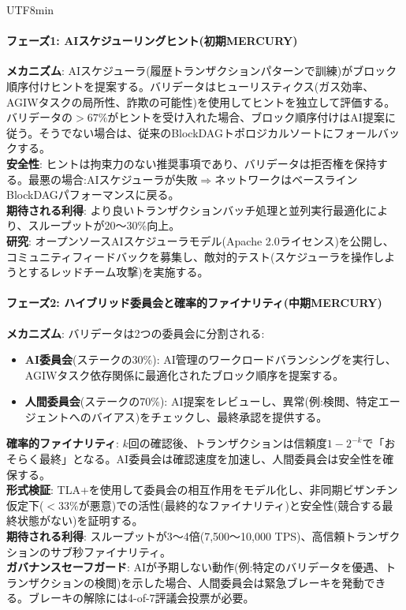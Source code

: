 \documentclass[11pt]{article}
\begin{document}
\begin{CJK}{UTF8}{min}
\paragraph{フェーズ1: AIスケジューリングヒント(初期MERCURY)}
\textbf{メカニズム}: AIスケジューラ(履歴トランザクションパターンで訓練)がブロック順序付けヒントを提案する。バリデータはヒューリスティクス(ガス効率、AGIWタスクの局所性、詐欺の可能性)を使用してヒントを独立して評価する。バリデータの$>67\%$がヒントを受け入れた場合、ブロック順序付けはAI提案に従う。そうでない場合は、従来のBlockDAGトポロジカルソートにフォールバックする。\\
\textbf{安全性}: ヒントは拘束力のない推奨事項であり、バリデータは拒否権を保持する。最悪の場合:AIスケジューラが失敗$\Rightarrow$ネットワークはベースラインBlockDAGパフォーマンスに戻る。\\
\textbf{期待される利得}: より良いトランザクションバッチ処理と並列実行最適化により、スループットが20〜30\%向上。\\
\textbf{研究}: オープンソースAIスケジューラモデル(Apache 2.0ライセンス)を公開し、コミュニティフィードバックを募集し、敵対的テスト(スケジューラを操作しようとするレッドチーム攻撃)を実施する。

\paragraph{フェーズ2: ハイブリッド委員会と確率的ファイナリティ(中期MERCURY)}
\textbf{メカニズム}: バリデータは2つの委員会に分割される:
\begin{itemize}[noitemsep]
  \item \textbf{AI委員会}(ステークの30\%): AI管理のワークロードバランシングを実行し、AGIWタスク依存関係に最適化されたブロック順序を提案する。
  \item \textbf{人間委員会}(ステークの70\%): AI提案をレビューし、異常(例:検閲、特定エージェントへのバイアス)をチェックし、最終承認を提供する。
\end{itemize}
\textbf{確率的ファイナリティ}: $k$回の確認後、トランザクションは信頼度$1 - 2^{-k}$で「おそらく最終」となる。AI委員会は確認速度を加速し、人間委員会は安全性を確保する。\\
\textbf{形式検証}: TLA+を使用して委員会の相互作用をモデル化し、非同期ビザンチン仮定下($<33\%$が悪意)での活性(最終的なファイナリティ)と安全性(競合する最終状態がない)を証明する。\\
\textbf{期待される利得}: スループットが3〜4倍(7,500〜10,000 TPS)、高信頼トランザクションのサブ秒ファイナリティ。\\
\textbf{ガバナンスセーフガード}: AIが予期しない動作(例:特定のバリデータを優遇、トランザクションの検閲)を示した場合、人間委員会は緊急ブレーキを発動できる。ブレーキの解除には4-of-7評議会投票が必要。


\end{CJK}
\end{document}
